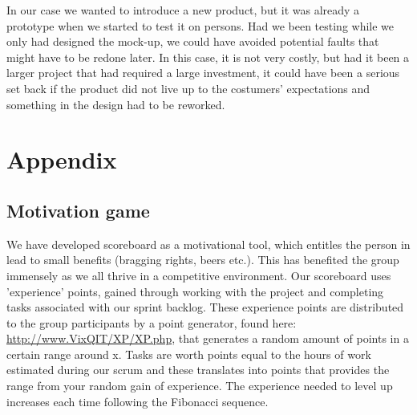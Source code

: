 \documentclass[12pt]{article}
\begin{document}
In our case we wanted to introduce a new product, but it was already a prototype when we started to test it on persons. Had we been testing while we only had designed the mock-up, we could have avoided potential faults that might have to be redone later. In this case, it is not very costly, but had it been a larger project that had required a large investment, it could have been a serious set back if the product did not live up to the costumers' expectations and something in the design had to be reworked.
 
\newpage 
\section{Appendix}
\subsection{Motivation game}
\label{game}
We have developed scoreboard as a motivational tool, which entitles the person in lead to small benefits (bragging rights, beers etc.). This has benefited the group immensely as we all thrive in a competitive environment. Our scoreboard uses 'experience' points, gained through working with the project and completing tasks associated with our sprint backlog. These experience points are distributed to the group participants by a point generator, found here: \url{http://www.VixQIT/XP/XP.php}, that generates a random amount of points in a certain range around x. Tasks are worth points equal to the hours of work estimated during our scrum and these translates into points that provides the range from your random gain of experience. The experience needed to level up increases each time following the Fibonacci sequence.\\
\end{document}
